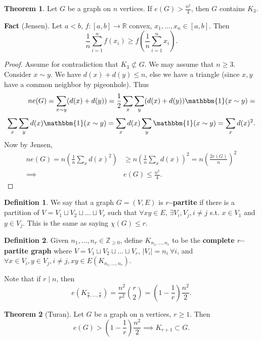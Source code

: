 \documentclass{article}
\theoremstyle{definition}
\newtheorem{theorem}{Theorem}[section]
\newtheorem{defn}{Definition}[section]
\begin{document}
\begin{theorem}
    Let $G$ be a graph on $n$ vertices. If $e(G)>\frac{n^2}{4}$, then $G$ contains $K_3$.
\end{theorem}
\textbf{Fact} (Jensen). Let $a<b$, $f : [a,b] \to \mathbb{R}$ convex, $x_1,\ldots,x_n \in [a,b]$. Then \[
\frac{1}{n} \sum_{i=1}^{n} f(x_i) \ge f\left(\frac{1}{n}\sum_{i=1}^{n} x_i\right).
\]
\begin{proof}
    Assume for contradiction that $K_3 \not\subset G$. We may assume that $n\ge 3$. Consider $x \sim y$. We have $d(x) + d(y) \le n$, else we have a triangle (since $x,y$ have a common neighbor by pigeonhole). Thus
    \begin{align*}
    n e(G) = \sum_{x\sim y}^{} (d(x)+d(y)) = \frac{1}{2}\sum_{x}^{} \sum_{y}^{} (d(x)+d(y))\mathbbm{1}(x\sim y) = \\
    \sum_{x}^{} \sum_{y}^{} d(x) \mathbbm{1}(x\sim y) = \sum_{x}^{} d(x) \sum_{y}^{} \mathbbm{1}(x\sim y) = \sum_{x}^{} d(x)^2.
    \end{align*}
    Now by Jensen,
    \begin{align*}
        ne(G) = n \left(\frac{1}{n} \sum_{x}^{} d(x)^2\right) &\ge n \left(\frac{1}{n}\sum_{x}^{} d(x) \right)^2 = n \left(\frac{2e(G)}{n} \right)^2 \\
        \implies &e(G) \le \frac{n^2}{4}.
    \end{align*}
\end{proof}
\begin{defn}
    We say that a graph $G=(V,E)$ is \textbf{$r$--partite} if there is a partition of $V = V_1 \sqcup V_2 \sqcup \ldots \sqcup V_r$ such that $\forall xy \in E$, $\exists V_i,V_j, i \neq j$ s.t. $x \in V_1$ and $y \in V_j$. This is the same as saying $\chi(G)\le r$.
\end{defn}
\begin{defn}
    Given $n_1,\ldots,n_r \in \mathbb{Z}_{\ge 0}$, define $K_{n_1,\ldots,n_r}$ to be the \textbf{complete $r$--partite graph} where $V = V_1 \sqcup V_2 \sqcup \ldots \sqcup V_r$, $|V_i|=n_i ~\forall i$, and $\forall x \in V_i, y \in V_j, i \neq j, xy \in E(K_{n_1,\ldots,n_r})$. 
\end{defn}
Note that if $r \mid n$, then \[
e(K_{\frac{n}{r},\ldots,\frac{n}{r}}) = \frac{n^2}{r^2}{{r}\choose{2}} = \left(1-\frac{1}{r}\right) \frac{n^2}{2}.
\]
\begin{theorem}[Turan]
    Let $G$ be a graph on n vertices, $r\ge 1$. Then \[
    e(G) > \left(1-\frac{1}{r}\right) \frac{n^2}{2} \implies K_{r+1} \subset G.
    \]
\end{theorem}
\end{document}
